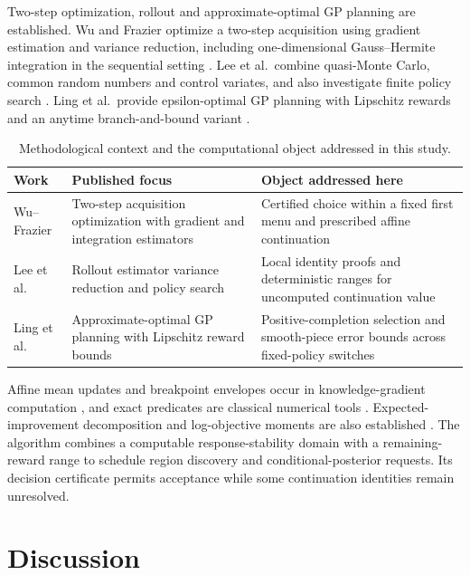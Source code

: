 \documentclass[]{interact}
\begin{document}
Two-step optimization, rollout and approximate-optimal GP planning are established. Wu and Frazier optimize a two-step acquisition using gradient estimation and variance reduction, including one-dimensional Gauss--Hermite integration in the sequential setting \citep{ref39}. Lee et al.\ combine quasi-Monte Carlo, common random numbers and control variates, and also investigate finite policy search \citep{ref43}. Ling et al.\ provide epsilon-optimal GP planning with Lipschitz rewards and an anytime branch-and-bound variant \citep{ref44}. 

\begin{table}[htbp]\centering\small
\caption{Methodological context and the computational object addressed in this study.}\label{tab:closest_scope}
\begin{tabular}{p{}p{}p{}}\toprule
Work & Published focus & Object addressed here\\\midrule
Wu--Frazier & Two-step acquisition optimization with gradient and integration estimators & Certified choice within a fixed first menu and prescribed affine continuation\\
Lee et al. & Rollout estimator variance reduction and policy search & Local identity proofs and deterministic ranges for uncomputed continuation value\\
Ling et al. & Approximate-optimal GP planning with Lipschitz reward bounds & Positive-completion selection and smooth-piece error bounds across fixed-policy switches\\
\bottomrule\end{tabular}\end{table}

Affine mean updates and breakpoint envelopes occur in knowledge-gradient computation \citep{ref40,ref42}, and exact predicates are classical numerical tools \citep{ref41}. Expected-improvement decomposition and log-objective moments are also established \citep{ref45}. The algorithm combines a computable response-stability domain with a remaining-reward range to schedule region discovery and conditional-posterior requests. Its decision certificate permits acceptance while some continuation identities remain unresolved.





\section{Discussion}
\end{document}
